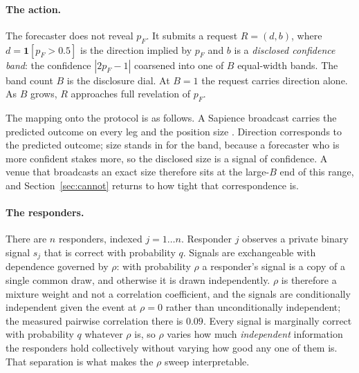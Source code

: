 \paragraph{The action.} The forecaster does not reveal $p_F$. It submits a request
$R = (d, b)$, where $d = \mathbf{1}[p_F > 0.5]$ is the direction implied by $p_F$
and $b$ is a \emph{disclosed confidence band}: the confidence $|2p_F - 1|$ coarsened into
one of $B$ equal-width bands. The band count $B$ is the disclosure dial. At $B=1$ the
request carries direction alone. As $B$ grows, $R$ approaches full revelation of $p_F$.

The mapping onto the protocol is as follows. A Sapience broadcast carries the predicted
outcome on every leg and the position size \cite{sapience2026relayer}. Direction corresponds
to the predicted outcome; size stands in for the band, because a forecaster who is more
confident stakes more, so the disclosed size is a signal of confidence. A venue that
broadcasts an exact size therefore sits at the large-$B$ end of this range, and
Section~\ref{sec:cannot} returns to how tight that correspondence is.

\paragraph{The responders.} There are $n$ responders, indexed $j = 1 \dots n$. Responder $j$
observes a private binary signal $s_j$ that is correct with probability $q$. Signals are
exchangeable with dependence governed by $\rho$: with probability $\rho$ a responder's
signal is a copy of a single common draw, and otherwise it is drawn independently. $\rho$ is
therefore a mixture weight and not a correlation coefficient, and the signals are
conditionally independent given the event at $\rho=0$ rather than unconditionally
independent; the measured pairwise correlation there is $0.09$. Every signal is marginally correct with probability $q$ whatever $\rho$ is,
so $\rho$ varies how much \emph{independent} information the responders hold collectively
without varying how good any one of them is. That separation is what makes the $\rho$ sweep
interpretable.

